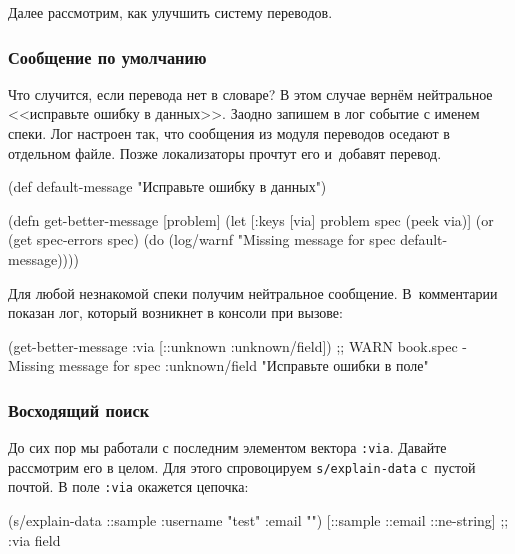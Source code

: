 Далее рассмотрим, как улучшить систему переводов.

\subsubsection{Сообщение по умолчанию}

Что случится, если перевода нет в словаре? В этом случае вернём нейтральное
<<исправьте ошибку в данных>>. Заодно запишем в лог событие с именем спеки. Лог
настроен так, что сообщения из модуля переводов оседают в отдельном файле. Позже
локализаторы прочтут его и~добавят перевод.

  \begin{clojure}
(def default-message
  "Исправьте ошибку в данных")
  \end{clojure}

\begin{english}
  \begin{clojure}
(defn get-better-message [problem]
  (let [{:keys [via]} problem
        spec (peek via)]
    (or (get spec-errors spec)
        (do (log/warnf "Missing message for spec %
            default-message))))
  \end{clojure}
\end{english}

\noindent
Для любой незнакомой спеки получим нейтральное сообщение. В~комментарии показан
лог, который возникнет в консоли при вызове:

  \begin{clojure}
(get-better-message {:via [::unknown :unknown/field]})
;; WARN book.spec - Missing message for spec :unknown/field
"Исправьте ошибки в поле"
  \end{clojure}

\subsubsection{Восходящий поиск}

До сих пор мы работали с последним элементом вектора \verb|:via|. Давайте
рассмотрим его в целом. Для этого спровоцируем \verb|s/explain-data| с~пустой
почтой. В поле \verb|:via| окажется цепочка:

\begin{english}
  \begin{clojure}
(s/explain-data ::sample {:username "test" :email ""})
[::sample ::email ::ne-string] ;; :via field
  \end{clojure}
\end{english}

